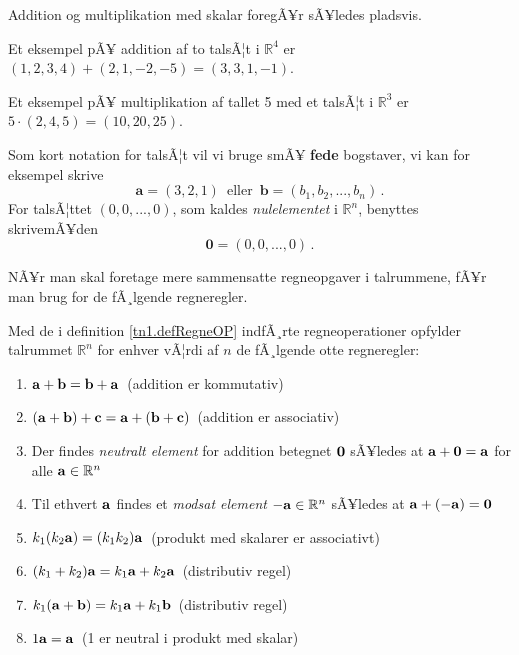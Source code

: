 Addition og multiplikation med skalar foregÃ¥r sÃ¥ledes pladsvis.

\begin{example}
Et eksempel pÃ¥ addition af to talsÃ¦t i  $\mathbb R ^4$ er
$(1,2,3,4)+(2,1,-2,-5)=(3,3,1,-1)$.
\end{example}
\begin{example}
Et eksempel pÃ¥ multiplikation af tallet 5 med et talsÃ¦t i  $\mathbb R ^3$ er
$5\cdot(2,4,5)=(10,20,25)$.
\end{example}

Som kort notation for talsÃ¦t vil vi bruge smÃ¥ \textbf{fede} bogstaver, vi kan for eksempel skrive 
$$\mathbf{a}=(3,2,1)\,\,\,\mathrm{eller}\,\,\,\mathbf{b}=(b_1,b_2,...,b_n)\,.$$
For talsÃ¦ttet $(0,0,...,0)$, som kaldes \emph{nulelementet} i $\mathbb R ^n$, benyttes skrivemÃ¥den $$\mathbf{0}=(0,0,...,0)\,.$$

NÃ¥r man skal foretage mere sammensatte regneopgaver i talrummene, fÃ¥r man brug for de fÃ¸lgende regneregler.

\begin{theorem}
Med de i definition \ref{tn1.defRegneOP} indfÃ¸rte regneoperationer opfylder talrummet $\mathbb R ^n$ for enhver vÃ¦rdi af $n$ de fÃ¸lgende otte regneregler:
\begin{enumerate}
\item
$ \mathbf{a} + \mathbf{b} = \mathbf{b} + \mathbf{a} $ \,(addition er kommutativ) 
\item
$ (\mathbf{a} + \mathbf{b}) + \mathbf{c} = \mathbf{a} + (\mathbf{b} + \mathbf{c}) $ \,(addition er associativ) 
\item
Der findes \textit{neutralt element} for addition betegnet $\bm{0}$ sÃ¥ledes at $\mathbf{a} + \bm{0} = \mathbf{a} $ for alle $\mathbf{a} \in \mathbb{R}^n$ 
\item
Til ethvert $\mathbf{a}$ findes et \textit{modsat element} $-\mathbf{a} \in \mathbb{R}^n$ sÃ¥ledes at $ \mathbf{a} + (-\mathbf{a}) = \bm{0} $ 
\item
$ k_1(k_2\mathbf{a}) = (k_1k_2)\mathbf{a} $ \,(produkt med skalarer er associativt) 
\item
$ (k_1 + k_2)\mathbf{a} = k_1\mathbf{a} + k_2\mathbf{a} $ \,(distributiv regel) 
\item
$ k_1(\mathbf{a}+\mathbf{b}) = k_1\mathbf{a} + k_1\mathbf{b} $ \,(distributiv regel)  
\item
$ 1\mathbf{a} = \mathbf{a} $ \,(1 er neutral i produkt med skalar) 
\end{enumerate}
\end{theorem}

